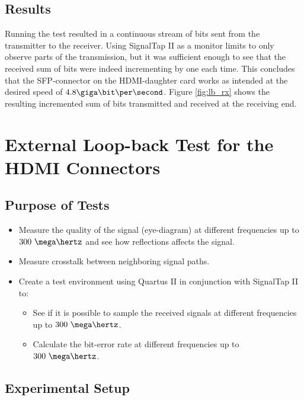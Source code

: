 \documentclass[main.tex]{subfiles}
\begin{document}
\subsection{Results}
Running the test resulted in a continuous stream of bits sent from the transmitter to the receiver. Using SignalTap II as a monitor limits to only observe parts of the transmission, but it was sufficient enough to see that the received sum of bits were indeed incrementing by one each time. This concludes that the SFP-connector on the HDMI-daughter card works as intended at the desired speed of $4.8 \giga\bit\per\second$. Figure \ref{fig:lb_rx} shows the resulting incremented sum of bits transmitted and received at the receiving end.


\section{External Loop-back Test for the HDMI Connectors}

\subsection{Purpose of Tests}

\begin{itemize}\setlength{\itemsep}{10pt}
\item Measure the quality of the signal (eye-diagram) at different frequencies up to $300~\mega\hertz$ and see how reflections affects the signal.
\item Measure crosstalk between neighboring signal paths.
\item Create a test environment using Quartus II in conjunction with SignalTap II to:
\begin{itemize}\setlength{\itemsep}{10pt}
  \item See if it is possible to sample the received signals at different frequencies up to $300~\mega\hertz$.
  \item Calculate the bit-error rate at different frequencies up to $300~\mega\hertz$.
\end{itemize}
\end{itemize}

\subsection{Experimental Setup}
\end{document}
